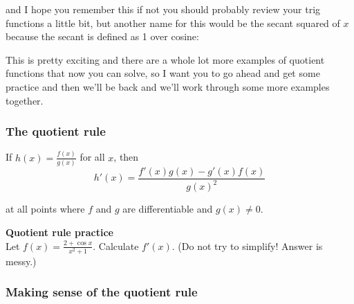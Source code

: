 \documentclass[pdftex, brazil, 12pt, twoside]{article}
\begin{document}
and I hope you remember this
if not you should probably review
your trig functions a little bit, but another name for this
would be the secant squared of $x$ because the secant is defined
as 1 over cosine:

\begin{figure}[H]
  \begin{center}
  \end{center}
\end{figure}

This is pretty exciting and there are a whole lot
more examples of quotient functions
that now you can solve, so I want
you to go ahead and get some practice and then we'll be back
and we'll work through some more examples together.

\subsubsection{The quotient rule}
\label{u2-quotient-rule-ex}

If $\displaystyle h(x) = \frac{f(x)}{g(x)}$ for all $x$, then
\begin{equation*}
  h'(x) = \frac{f'(x)g(x) - g'(x)f(x)}{g(x)^2}
\end{equation*}

at all points where $f$ and $g$ are differentiable and $g(x) \ne 0$.

\begin{exercise}
  \textbf{Quotient rule practice}\\%
  Let $\displaystyle f(x) = \frac{2 + \cos x}{x^2 + 1}$. Calculate $f'(x)$.
  (Do not try to simplify! Answer is messy.)
\end{exercise}

\subsubsection{Making sense of the quotient rule}
\label{u2-quotient-rule-making-sense}
\end{document}
